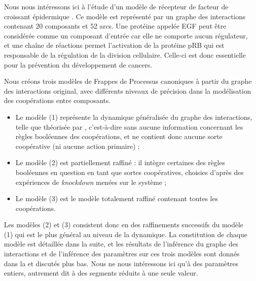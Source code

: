 Nous nous intéressons ici à l'étude d'un modèle de récepteur de facteur de croissant épidermique
\cite{Sahin09}.
Ce modèle est représenté par un graphe des interactions contenant 20 composants et 52 arcs.
Une protéine appelée EGF peut être considérée comme un composant d'entrée
car elle ne comporte aucun régulateur,
et une chaîne de réactions permet l'activation de la protéine pRB qui est responsable
de la régulation de la division cellulaire.
Celle-ci est donc essentielle pour la prévention du développement de cancers.

Nous créons trois modèles de Frappes de Processus canoniques
à partir du graphe des interactions original, avec différents niveaux
de précision dans la modélisation des coopérations entre composants.
\begin{itemize}
  \item Le modèle (1) représente la dynamique généralisée du graphe des interactions,
    telle que théorisée par ,
    c'est-à-dire sans aucune information concernant les règles booléennes des coopérations,
    et ne contient donc aucune sorte coopérative (ni aucune action primaire) ;
  \item Le modèle (2) est partiellement raffiné : il intègre certaines des règles
    booléennes en question en tant que sortes coopératives,
    choisies d'après des expériences de \textit{knockdown} menées sur le système ;
  \item Le modèle (3) est le modèle totalement raffiné contenant toutes les coopérations.
\end{itemize}
Les modèles (2) et (3) consistent donc en des raffinements successifs du modèle (1)
qui est le plus général au niveau de la dynamique.
La constitution de chaque modèle est détaillée dans la suite,
et les résultats de l'inférence du graphe des interactions et de l'inférence des paramètres
sur ces trois modèles sont donnés dans la 
et discutés plus bas.
Nous ne nous intéressons ici qu'à des paramètres entiers,
autrement dit à des segments réduits à une seule valeur.


